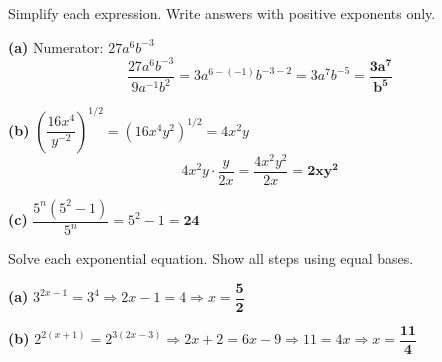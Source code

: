 \documentclass[addpoints]{exam}
\begin{document}
\begin{questions}
\question Simplify each expression. Write answers with positive exponents only.
\begin{solution}[9cm]
\textbf{(a)} Numerator: $27a^6 b^{-3}$
\[
\frac{27a^6 b^{-3}}{9a^{-1}b^2} = 3a^{6-(-1)}b^{-3-2} = 3a^7 b^{-5} = \mathbf{\frac{3a^7}{b^5}}
\]

\textbf{(b)} $\left(\dfrac{16x^4}{y^{-2}}\right)^{1/2} = \left(16x^4 y^2\right)^{1/2}
= 4x^2 y$
\[
4x^2 y \cdot \frac{y}{2x} = \frac{4x^2 y^2}{2x} = \mathbf{2xy^2}
\]

\textbf{(c)} $\dfrac{5^n(5^2 - 1)}{5^n} = 5^2 - 1 = \mathbf{24}$
\end{solution}

\question Solve each exponential equation. Show all steps using equal bases.
\begin{solution}[9cm]
\textbf{(a)} $3^{2x-1} = 3^4 \Rightarrow 2x - 1 = 4 \Rightarrow x = \mathbf{\dfrac{5}{2}}$

\textbf{(b)} $2^{2(x+1)} = 2^{3(2x-3)} \Rightarrow 2x+2 = 6x-9 \Rightarrow 11 = 4x
\Rightarrow x = \mathbf{\dfrac{11}{4}}$


\end{solution}
\end{questions}
\end{document}
